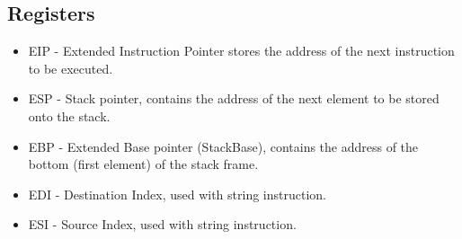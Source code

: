 \subsection{Registers}
\begin{itemize}
    \item EIP - Extended Instruction Pointer stores the address of the next instruction to be executed.
    \item ESP - Stack pointer, contains the address of the next element to be stored onto the stack.
    \item EBP - Extended Base pointer (StackBase), contains the address of the bottom (first element) of the stack frame.
    \item EDI - Destination Index, used with string instruction.
    \item ESI - Source Index, used with string instruction.
\end{itemize}
